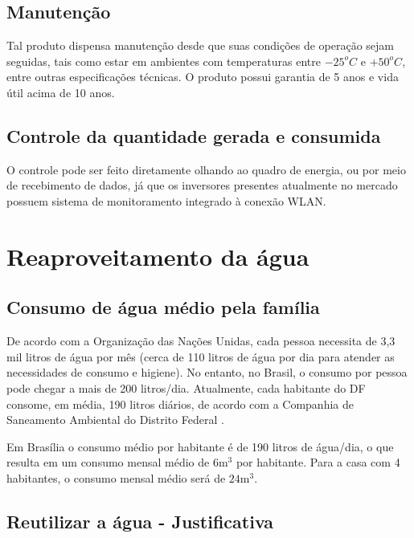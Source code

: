 \subsection{Manutenção}

	Tal produto dispensa manutenção desde que suas condições de operação sejam seguidas, tais como estar em ambientes com temperaturas entre $-25^oC$ e $+50^oC$, entre outras especificações técnicas. O produto possui garantia de 5 anos e vida útil acima de 10 anos.


\subsection{Controle da quantidade gerada e consumida}

	O controle pode ser feito diretamente olhando ao quadro de energia, ou por meio de recebimento de dados, já que os inversores presentes atualmente no mercado possuem sistema de monitoramento integrado à conexão WLAN.


\section{Reaproveitamento da água}

\subsection{Consumo de água médio pela família}

	De acordo com a Organização das Nações Unidas, cada pessoa necessita de 3,3 mil litros de água por mês (cerca de 110 litros de água por dia para atender as necessidades de consumo e higiene). No entanto, no Brasil, o consumo por pessoa pode chegar a mais de 200 litros/dia. Atualmente, cada habitante do DF consome, em média, 190 litros diários, de acordo com a Companhia de Saneamento Ambiental do Distrito Federal \cite{CAESB}.

	Em Brasília o consumo médio por habitante é de 190 litros de água/dia, o que resulta em um consumo mensal médio de $6\si{\meter}^3$ por habitante. Para a casa com 4 habitantes, o consumo mensal médio será de $24\si{\meter}^3$.

\subsection{Reutilizar a água - Justificativa}

